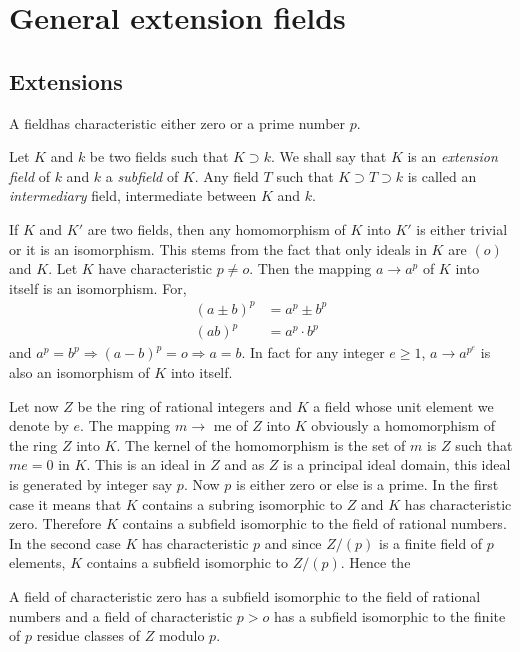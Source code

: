\chapter{General extension fields}\label{chap1}

\section{Extensions}\label{c1:s1}%

A field\pageoriginale has characteristic either zero or a prime number
$p$. 

Let $K$ and $k$ be two fields such that $K \supset k$. We shall say
that $K$ is an \textit{extension field} of $k$ and $k$ a
\textit{subfield} of $K$. Any field $T$ such that $K \supset T \supset
k$ is called an \textit{intermediary} field, intermediate between $K$
and $k$. 

If $K$ and $K'$ are two fields, then any homomorphism of $K$ into $K'$
is either trivial or it is an isomorphism. This stems from the fact
that only ideals in $K$ are $(o)$ and $K$. Let $K$ have characteristic
$p \neq o$. Then the mapping $a \to a^p$ of $K$ into itself is an
isomorphism. For, 
\begin{align*}
(a \pm b)^p & = a^p \pm b^p\\
(ab)^p & = a^p \cdot b^p
\end{align*}
and $a^p = b^p \Longrightarrow (a-b)^p = o \Longrightarrow a = b$. In
fact for any integer $e \geq 1$, $a \to a^{p^e}$ is also an isomorphism
of $K$ into itself. 

Let now $Z$ be the ring of rational integers and $K$ a field whose
unit element we denote by $e$. The mapping $m \to $ me  of $Z$ into
$K$ obviously a homomorphism of the ring $Z$ into $K$. The kernel of
the homomorphism is the set of $m$ is $Z$ such that $me =0$ in
$K$. This is an ideal in $Z$ and as $Z$ is a principal ideal domain,
this ideal is generated by integer say $p$. Now $p$ is either zero or
else is a prime. In the first case it means that $K$ contains a
subring isomorphic to $Z$ and $K$ has characteristic zero. Therefore
$K$ contains a subfield isomorphic to the field of rational numbers. In  the
second case $K$ has characteristic $p$ and since $Z/ (p)$ is a finite
\pageoriginale field of $p$ elements, $K$ contains a subfield
isomorphic to $Z / (p)$. Hence the 

\begin{thm}\label{c1:thm1}%
 A field of characteristic zero has a subfield isomorphic to the
  field of rational numbers and a field of characteristic $p > o$ has
  a subfield isomorphic to the finite of $p$ residue classes of $Z$
  modulo $p$. 
\end{thm}

